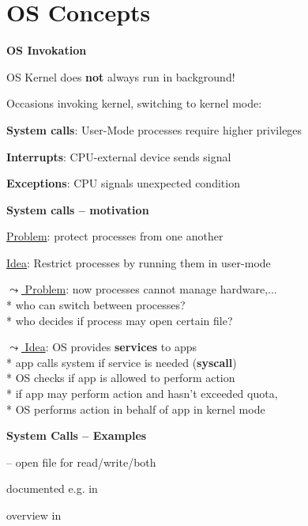 \section{OS Concepts}

\textbf{OS Invokation}
\begin{items}
	\item OS Kernel does \textbf{not} always run in background!
	\item Occasions invoking kernel, switching to kernel mode:
	\begin{enumeration}
		\item \textbf{System calls}: User-Mode processes require higher privileges
		\item \textbf{Interrupts}: CPU-external device sends signal
		\item \textbf{Exceptions}: CPU signals unexpected condition
	\end{enumeration}
\end{items}

\textbf{System calls -- motivation}
\begin{items}
	\item \underline{Problem}: protect processes from one another
	\item \underline{Idea}: Restrict processes by running them in user-mode
	\item \underline{\( \leadsto \) Problem}: now processes cannot manage hardware,... \\*
		who can switch between processes? \\*
		who decides if process may open certain file?
	\item \underline{\( \leadsto \) Idea}: OS provides \textbf{services} to apps \\*
		app calls system if service is needed (\textbf{syscall}) \\*
		OS checks if app is allowed to perform action \\*
		if app may perform action and hasn't exceeded quota, \\* \phantom{x} OS performs action in behalf of app in kernel mode
\end{items}

\textbf{System Calls -- Examples}
\begin{items}
	\item {} -- open file for read/write/both
	\item documented e.g. in 
	\item overview in 
\end{items}

